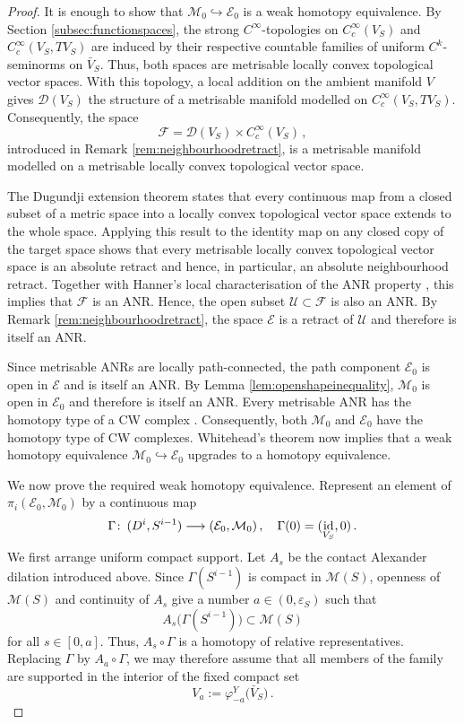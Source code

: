 \documentclass{amsart}
\theoremstyle{definition}
\def\co{\colon\thinspace}
\newcommand{\DD}{\mathcal D}
\newcommand{\EE}{\mathcal E}
\newcommand{\FF}{\mathcal F}
\newcommand{\MM}{\mathcal M}
\newcommand{\UU}{\mathcal U}
\newcommand{\lra}{\longrightarrow}
\DeclareMathOperator{\id}{\mathrm{id}}
\begin{document}
\begin{proof}
It is enough to show that $\MM_0\hookrightarrow\EE_0$
is a weak homotopy equivalence.
By Section \ref{subsec:functionspaces},
the strong $C^{\infty}$-topologies on
$C_c^{\infty}(V_S)$ and
$C_c^{\infty}(V_S,TV_S)$
are induced by their respective countable families
of uniform $C^k$-seminorms on $\bar{V}_S$.
Thus, both spaces are metrisable locally convex
topological vector spaces.
With this topology,
a local addition on the ambient manifold $V$
gives $\DD(V_S)$ the structure
of a metrisable manifold modelled on
$C_c^{\infty}(V_S,TV_S)$.
Consequently, the space
\[
\FF=\DD(V_S)\times C_c^{\infty}(V_S)
\,,
\]
introduced in Remark \ref{rem:neighbourhoodretract},
is a metrisable manifold modelled on a metrisable
locally convex topological vector space.

The Dugundji extension theorem
\cite[Theorem~4.1]{du51}
states that every continuous map from a closed subset
of a metric space into a locally convex topological vector space
extends to the whole space.
Applying this result to the identity map on any closed copy
of the target space shows that every metrisable locally convex
topological vector space is an absolute retract
and hence, in particular, an absolute neighbourhood retract.
Together with Hanner's local characterisation
of the ANR property \cite[Theorem~3.3]{ha51},
this implies that $\FF$ is an ANR.
Hence, the open subset $\UU\subset\FF$ is also an ANR.
By Remark \ref{rem:neighbourhoodretract},
the space $\EE$ is a retract of $\UU$
and therefore is itself an ANR.

Since metrisable ANRs are locally path-connected,
the path component $\EE_0$ is open in $\EE$
and is itself an ANR.
By Lemma \ref{lem:openshapeinequality},
$\MM_0$ is open in $\EE_0$
and therefore is itself an ANR.
Every metrisable ANR has the homotopy type
of a CW complex \cite[Theorem~2]{mi59}.
Consequently, both $\MM_0$ and $\EE_0$
have the homotopy type of CW complexes.
Whitehead's theorem
\cite[Theorem~4.5; see also p.~352]{hat02}
now implies that a weak homotopy equivalence
$\MM_0\hookrightarrow\EE_0$
upgrades to a homotopy equivalence.

We now prove the required weak homotopy equivalence.
Represent an element of $\pi_i(\EE_0,\MM_0)$
by a continuous map
\[
\Gamma\co
(D^i,S^{i-1})\lra(\EE_0,\MM_0)
\,,
\quad
\Gamma(0)=(\id_{V_S},0)
\,.
\]
We first arrange uniform compact support.
Let $A_s$ be the contact Alexander dilation
introduced above.
Since $\Gamma(S^{i-1})$ is compact in $\MM(S)$,
openness of $\MM(S)$ and continuity of $A_s$
give a number $a\in(0,\varepsilon_S)$ such that
\[
A_s\big(\Gamma(S^{i-1})\big)\subset\MM(S)
\]
for all $s\in[0,a]$.
Thus, $A_s\circ\Gamma$ is a homotopy
of relative representatives.
Replacing $\Gamma$ by $A_a\circ\Gamma$,
we may therefore assume that all members
of the family are supported
in the interior of the fixed compact set
\[
V_a:=
\varphi^Y_{-a}\big(\bar{V}_S\big)
\,.
\]


\end{proof}
\end{document}
